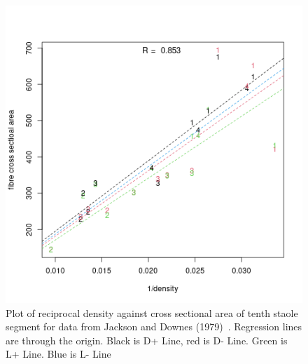 %

\begin{figure}[h]
  \centering
   \includegraphics[width=1.1\textwidth]{SDP/sdpArecN.png}
  \caption{Plot of reciprocal density against cross sectional area of tenth staole segment for data from Jackson and Downes (1979)~\cite{jack:79}. Regression lines are through the origin. Black is D+ Line, red is D- Line. Green  is L+ Line. Blue is L- Line} 
  \label{fig:sdpArecN}
\end{figure}

%

